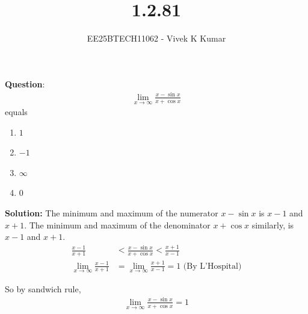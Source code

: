 \documentclass[journal]{IEEEtran}
\title{1.2.81}
\author{EE25BTECH11062 - Vivek K Kumar}
\begin{document}
\maketitle

\renewcommand{\thefigure}{\theenumi}
\renewcommand{\thetable}{\theenumi}


\textbf{Question}:\\
\begin{align}
    \lim\limits_{x\to\infty} \frac{x-\sin x}{x+\cos x} 
\end{align}
equals
\begin{enumerate}
    \item $1$
    \item $-1$
    \item $\infty$
    \item $0$
\end{enumerate}
\textbf{Solution: }
The minimum and maximum of the numerator $x-\sin x$ is $x-1$ and $x+1$. The minimum and maximum of the denominator $x+\cos x$ similarly, is $x-1$ and $x+1$. 
\begin{align}
    \frac{x-1}{x+1} &< \frac{x-\sin x}{x+\cos x} < \frac{x+1}{x-1} \\
    \lim\limits_{x\to\infty} \frac{x-1}{x+1} &= \lim\limits_{x\to\infty} \frac{x+1}{x-1} = 1 \text{ (By L'Hospital)}
\end{align}

So by sandwich rule,
\begin{align}
    \lim\limits_{x\to\infty} \frac{x-\sin x}{x+\cos x}  = 1
\end{align}

\begin{center}
\end{center}
\end{document}
